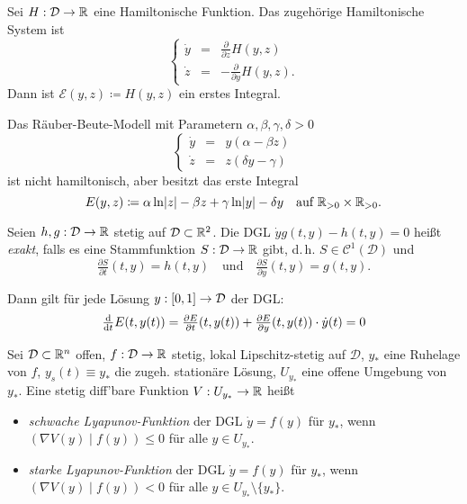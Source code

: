 \documentclass{cheat-sheet}
\newcommand{\D}{\mathcal{D}}
\newcommand{\E}{\mathcal{E}}
\newcommand{\scp}[2]{\left( #1 \!\mid\! #2 \right)} %
\begin{document}
\begin{bsp}
  Sei $H : \D \to \R$ eine Hamiltonische Funktion. Das zugehörige Hamiltonische System ist
  \[
    \left\{ \begin{array}{lll}
      \dot{y} &= & \tfrac{\partial}{\partial z} H(y, z) \\
      \dot{z} &= & - \tfrac{\partial}{\partial y} H(y, z).
    \end{array} \right.
  \]
  Dann ist $\E(y, z) \coloneqq H(y, z)$ ein erstes Integral.
\end{bsp}


\begin{bsp}
  Das Räuber-Beute-Modell mit Parametern $\alpha, \beta, \gamma, \delta > 0$
  \[
    \left\{ \begin{array}{lll}
      \dot{y} &= & y (\alpha - \beta z) \\
      \dot{z} &= & z (\delta y - \gamma)
    \end{array} \right.
  \]
  ist nicht hamiltonisch, aber besitzt das erste Integral
  \[
    E(y, z) \coloneqq \alpha \ln \lvert z\rvert - \beta z + \gamma \ln \lvert y\rvert - \delta y
    \quad \text{auf } \mathbb{R}_{>0} \times \mathbb{R}_{>0}.
  \]
\end{bsp}

\begin{defn}
  Seien $h, g : \D \to \R$ stetig auf $\D \subset \R^2$. Die DGL $\dot{y} g(t, y) - h(t, y) = 0$ heißt \emph{exakt}, falls es eine Stammfunktion $S : \D \to \R$ gibt, d.\,h. $S \in \mathcal{C}^1(\D)$ und
  \[
    \tfrac{\partial S}{\partial t} (t, y) = h(t, y)
    \quad \text{und} \quad
    \tfrac{\partial S}{\partial y} (t, y) = g(t, y).
  \]
\end{defn}

\begin{bem}
  Dann gilt für jede Lösung $y : \I \to \D$ der DGL:
  \[
    \tfrac{\d}{\d t} E(t, y(t)) = \tfrac{\partial E}{\partial t} (t, y(t)) + \tfrac{\partial E}{\partial y} (t, y(t)) \cdot \dot{y}(t) = 0 %
  \]
\end{bem}


\begin{defn}
  Sei $\D \subset \R^n$ offen, $f : \D \to \R$ stetig, lokal Lipschitz-stetig auf $\D$, $y_{*}$ eine Ruhelage von $f$, $y_s(t) \equiv y_{*}$ die zugeh. stationäre Lösung, $U_{y_{*}}$ eine offene Umgebung von $y_{*}$. Eine stetig diff'bare Funktion $V : U_{y_{*}} \to \mathbb{R}$ heißt
  \begin{itemize}
    \item \emph{schwache Lyapunov-Funktion} der DGL $\dot{y} = f(y)$ für $y_{*}$, wenn $\scp{\nabla V(y)}{f(y)} \leq 0$ für alle $y \in U_{y_{*}}$.
    \item \emph{starke Lyapunov-Funktion} der DGL $\dot{y} = f(y)$ für $y_{*}$, wenn $\scp{\nabla V(y)}{f(y)} < 0$ für alle $y \in U_{y_{*}} \setminus \{ y_{*} \}$.
  \end{itemize}
\end{defn}
\end{document}
